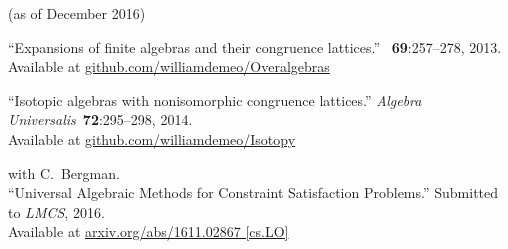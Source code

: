 \documentclass{article}
\begin{document}
\thispagestyle{empty}

 (as of December 2016)
\nocite{*}

\renewcommand{\refname}{\normalsize Journal Articles}

\begin{thebibliography}{10}

  \newblock ``Expansions of finite algebras and their congruence lattices.''
  ~{\bf 69}:257--278, 2013.\\ %
  \newblock Available at
  \href{https://github.com/williamdemeo/Overalgebras}
       {{\small github.com/williamdemeo/Overalgebras}}

       
  \newblock ``Isotopic algebras with nonisomorphic congruence lattices.''
  \newblock \emph{Algebra Universalis}~{\bf 72}:295--298, 2014.\\
  \newblock Available at
  \href{https://github.com/williamdemeo/Isotopy}
       {{\small github.com/williamdemeo/Isotopy}}

  with C.~Bergman.\\
  \newblock ``Universal Algebraic Methods for Constraint Satisfaction Problems.''
  \newblock Submitted to \emph{LMCS}, 2016.\\
  \newblock Available at
  \href{https://arxiv.org/abs/1611.02867}{{\small arxiv.org/abs/1611.02867  [cs.LO]}}

\end{thebibliography}

\renewcommand{\refname}{\normalsize Conference Proceedings}
  
\end{document}
